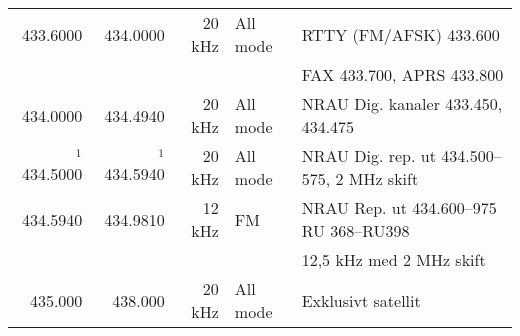 \documentclass[10pt,swedish,a4paper,twoside]{article}
\begin{document}
\begin{landscape}
\begin{tabular}{rrrll}
	         433.6000 &      434.0000 &      20 kHz & All mode        & RTTY (FM/AFSK) 433.600                            \\
	                  &               &             &                 & FAX 433.700, APRS 433.800                         \\ \hline
	         434.0000 &      434.4940 &      20 kHz & All mode        & NRAU Dig. kanaler 433.450, 434.475                \\ \hline
	    $^1$ 434.5000 & $^1$ 434.5940 &      20 kHz & All mode        & NRAU Dig. rep. ut 434.500--575, 2 MHz skift       \\ \hline
	         434.5940 &      434.9810 &      12 kHz & FM              & NRAU Rep. ut 434.600--975 RU 368--RU398           \\
	                  &               &             &                 & 12,5 kHz med 2 MHz skift                          \\ \hline
	          435.000 &       438.000 &      20 kHz & All mode        & Exklusivt satellit
\end{tabular}

\end{landscape}
\end{document}
